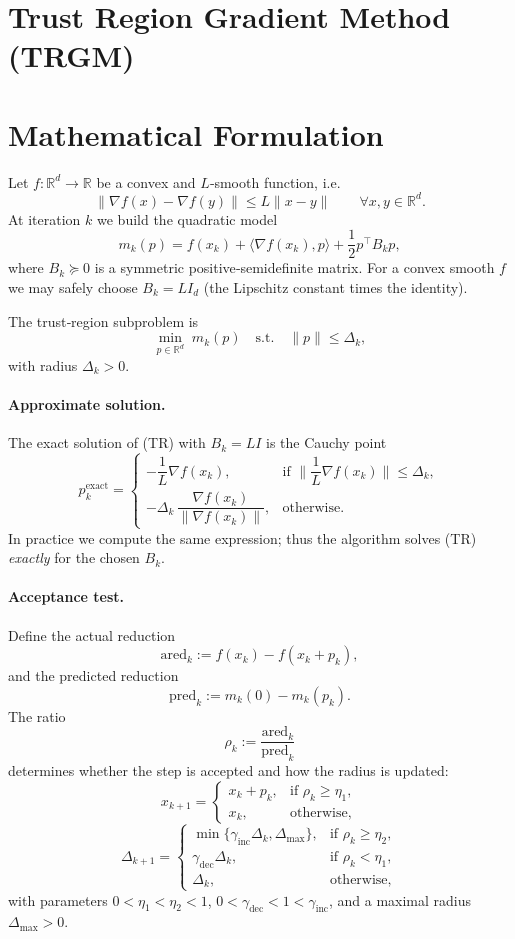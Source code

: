 \documentclass{article}
\begin{document}
\section*{Trust Region Gradient Method (TRGM)}

\section*{Mathematical Formulation}
Let $f:\mathbb{R}^{d}\rightarrow\mathbb{R}$ be a convex and $L$‑smooth function, i.e.
\[
\|\nabla f(x)-\nabla f(y)\|\le L\|x-y\|\qquad\forall x,y\in\mathbb{R}^{d}.
\]
At iteration $k$ we build the quadratic model
\[
m_k(p)=f(x_k)+\langle\nabla f(x_k),p\rangle+\frac{1}{2}p^{\top}B_kp,
\]
where $B_k\succeq 0$ is a symmetric positive‑semidefinite matrix.  
For a convex smooth $f$ we may safely choose $B_k=L I_d$ (the Lipschitz constant times the identity).  

The trust‑region subproblem is
\[
\min_{p\in\mathbb{R}^{d}}\; m_k(p)\quad\text{s.t.}\quad \|p\|\le\Delta_k,
\tag{TR}
\]
with radius $\Delta_k>0$.

\paragraph{Approximate solution.}
The exact solution of (TR) with $B_k=LI$ is the Cauchy point
\[
p_k^{\text{exact}}=
\begin{cases}
-\dfrac{1}{L}\nabla f(x_k), & \text{if }\displaystyle\Big\|\dfrac{1}{L}\nabla f(x_k)\Big\|\le\Delta_k,\\[2ex]
-\Delta_k\,\dfrac{\nabla f(x_k)}{\|\nabla f(x_k)\|}, & \text{otherwise.}
\end{cases}
\]
In practice we compute the same expression; thus the algorithm solves (TR) \emph{exactly} for the chosen $B_k$.

\paragraph{Acceptance test.}
Define the actual reduction
\[
\text{ared}_k:=f(x_k)-f(x_k+p_k),
\]
and the predicted reduction
\[
\text{pred}_k:=m_k(0)-m_k(p_k).
\]
The ratio
\[
\rho_k:=\frac{\text{ared}_k}{\text{pred}_k}
\tag{1}
\]
determines whether the step is accepted and how the radius is updated:
\[
x_{k+1}=
\begin{cases}
x_k+p_k, & \text{if }\rho_k\ge\eta_1,\\[1ex]
x_k, & \text{otherwise,}
\end{cases}
\tag{2}
\]
\[
\Delta_{k+1}=
\begin{cases}
\min\{\gamma_{\text{inc}}\Delta_k,\Delta_{\max}\}, & \text{if }\rho_k\ge\eta_2,\\[1ex]
\gamma_{\text{dec}}\Delta_k, & \text{if }\rho_k<\eta_1,\\[1ex]
\Delta_k, & \text{otherwise,}
\end{cases}
\tag{3}
\]
with parameters $0<\eta_1<\eta_2<1$, $0<\gamma_{\text{dec}}<1<\gamma_{\text{inc}}$, and a maximal radius $\Delta_{\max}>0$.
\end{document}
